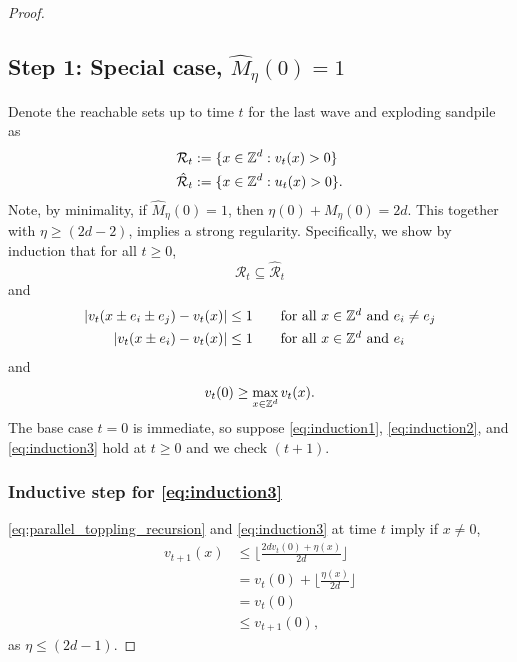 \documentclass[12pt]{amsart}
\begin{document}
\begin{proof}
	\subsection*{Step 1: Special case,  \texorpdfstring{$\hat{M}_{\eta}(0) = 1$}{One firing} }
	Denote the reachable sets up to time $t$ for the last wave and exploding sandpile as 
	\begin{equation} \label{eq:reachablesets_definition}
	\begin{aligned}
	\mathcal{R}_t &:= \{ x \in \mathbb{Z}^d : v_t(x) > 0 \} \\
	\hat{\mathcal{R}}_t &:= \{ x \in \mathbb{Z}^d : u_t(x) > 0 \}.
	\end{aligned}
	\end{equation}
	Note, by minimality, if $\hat{M}_{\eta}(0) = 1$, then $\eta(0) + M_{\eta}(0) = 2 d$. 
	This together with $\eta \geq (2 d- 2)$, implies a strong regularity. 
	Specifically, we show by induction that for all $t \geq 0$,
	\begin{equation} \label{eq:induction1}
	\mathcal{R}_t \subseteq \hat{\mathcal{R}}_t 
	\end{equation}
	and 
	\begin{equation} \label{eq:induction2}
	\begin{aligned}
	|v_t(x \pm e_i \pm e_j) - v_t(x)| &\leq 1  \qquad \mbox{for all $x \in \mathbb{Z}^d$ and $e_i \not = e_j$} \\
	|v_t(x \pm e_i) - v_t(x)| &\leq 1   \qquad \mbox{for all $x \in \mathbb{Z}^d$ and $e_i$}
	\end{aligned}
	\end{equation}
	and 
	\begin{equation} \label{eq:induction3}
	v_t(0) \geq \max_{x \in \mathbb{Z}^d} v_t(x).
	\end{equation}
	The base case $t = 0$ is immediate, so suppose \eqref{eq:induction1}, \eqref{eq:induction2}, and \eqref{eq:induction3}
	hold at $t \geq 0$ and we check $(t+1)$.  
	\subsubsection*{Inductive step for \eqref{eq:induction3}}
	\eqref{eq:parallel_toppling_recursion} and \eqref{eq:induction3} at time $t$ imply
	if $x \not = 0$, 
	\begin{align*}
	v_{t+1}(x) &\leq \lfloor \frac{2 d  v_t(0) + \eta(x) }{2 d} \rfloor \\
	&= v_t(0) + \lfloor \frac{\eta(x)}{2 d} \rfloor \\
	&= v_t(0) \\
	&\leq v_{t+1}(0),
	\end{align*}
	as $\eta \leq (2 d - 1)$. 
	

\end{proof}
\end{document}
